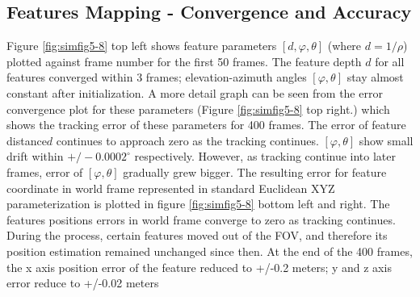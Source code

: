 \subsection{Features Mapping - Convergence and Accuracy}

Figure \ref{fig:simfig5-8} top left shows feature parameters $[d,
\varphi ,\theta]$ (where $d=1/\rho $) plotted against frame number for
the first 50 frames. The feature depth $d$ for all features converged
within 3 frames; elevation-azimuth angles $[\varphi ,\theta]$ stay
almost constant after initialization. A more detail graph can be seen
from the error convergence plot for these parameters (Figure
\ref{fig:simfig5-8} top right.) which shows the tracking error of
these parameters for 400 frames. The error of feature distance$ d$
continues to approach zero as the tracking continues. $[\varphi
,\theta]$ show small drift within $+/-0.0002^{\circ}$ respectively.
However, as tracking continue into later frames, error of $[\varphi
,\theta]$ gradually grew bigger. The resulting error for feature
coordinate in world frame represented in standard Euclidean XYZ
parameterization is plotted in figure \ref{fig:simfig5-8} bottom left
and right. The features positions errors in world frame converge to
zero as tracking continues. During the process, certain features moved
out of the FOV, and therefore its position estimation remained
unchanged since then. At the end of the 400 frames, the x axis
position error of the feature reduced to +/-0.2 meters; y and z axis
error reduce to +/-0.02 meters

